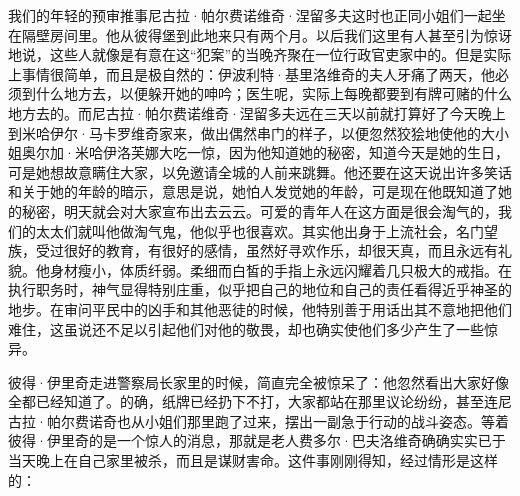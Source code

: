 \par 我们的年轻的预审推事尼古拉·帕尔费诺维奇·涅留多夫这时也正同小姐们一起坐在隔壁房间里。他从彼得堡到此地来只有两个月。以后我们这里有人甚至引为惊讶地说，这些人就像是有意在这“犯案”的当晚齐聚在一位行政官吏家中的。但是实际上事情很简单，而且是极自然的：伊波利特·基里洛维奇的夫人牙痛了两天，他必须到什么地方去，以便躲开她的呻吟；医生呢，实际上每晚都要到有牌可赌的什么地方去的。而尼古拉·帕尔费诺维奇·涅留多夫远在三天以前就打算好了今天晚上到米哈伊尔·马卡罗维奇家来，做出偶然串门的样子，以便忽然狡狯地使他的大小姐奥尔加·米哈伊洛芙娜大吃一惊，因为他知道她的秘密，知道今天是她的生日，可是她想故意瞒住大家，以免邀请全城的人前来跳舞。他还要在这天说出许多笑话和关于她的年龄的暗示，意思是说，她怕人发觉她的年龄，可是现在他既知道了她的秘密，明天就会对大家宣布出去云云。可爱的青年人在这方面是很会淘气的，我们的太太们就叫他做淘气鬼，他似乎也很喜欢。其实他出身于上流社会，名门望族，受过很好的教育，有很好的感情，虽然好寻欢作乐，却很天真，而且永远有礼貌。他身材瘦小，体质纤弱。柔细而白皙的手指上永远闪耀着几只极大的戒指。在执行职务时，神气显得特别庄重，似乎把自己的地位和自己的责任看得近乎神圣的地步。在审问平民中的凶手和其他恶徒的时候，他特别善于用话出其不意地把他们难住，这虽说还不足以引起他们对他的敬畏，却也确实使他们多少产生了一些惊异。
\par 彼得·伊里奇走进警察局长家里的时候，简直完全被惊呆了：他忽然看出大家好像全都已经知道了。的确，纸牌已经扔下不打，大家都站在那里议论纷纷，甚至连尼古拉·帕尔费诺奇也从小姐们那里跑了过来，摆出一副急于行动的战斗姿态。等着彼得·伊里奇的是一个惊人的消息，那就是老人费多尔·巴夫洛维奇确确实实已于当天晚上在自己家里被杀，而且是谋财害命。这件事刚刚得知，经过情形是这样的：
